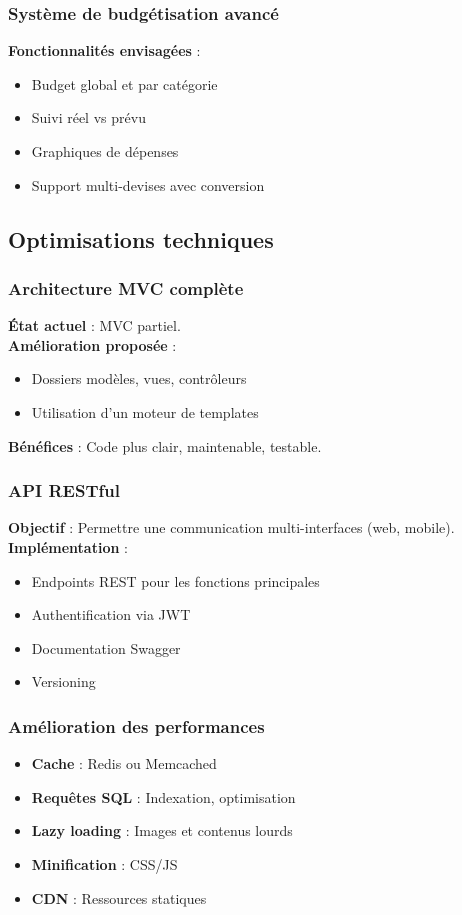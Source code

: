 \documentclass[a4paper,12pt]{article}
\begin{document}
\subsubsection{Système de budgétisation avancé}
\textbf{Fonctionnalités envisagées} :
\begin{itemize}
  \item Budget global et par catégorie
  \item Suivi réel vs prévu
  \item Graphiques de dépenses
  \item Support multi-devises avec conversion
\end{itemize}

\subsection{Optimisations techniques}

\subsubsection{Architecture MVC complète}
\textbf{État actuel} : MVC partiel.\\
\textbf{Amélioration proposée} :
\begin{itemize}
  \item Dossiers modèles, vues, contrôleurs
  \item Utilisation d’un moteur de templates
\end{itemize}
\textbf{Bénéfices} : Code plus clair, maintenable, testable.

\subsubsection{API RESTful}
\textbf{Objectif} : Permettre une communication multi-interfaces (web, mobile).\\
\textbf{Implémentation} :
\begin{itemize}
  \item Endpoints REST pour les fonctions principales
  \item Authentification via JWT
  \item Documentation Swagger
  \item Versioning
\end{itemize}

\subsubsection{Amélioration des performances}
\begin{itemize}
  \item \textbf{Cache} : Redis ou Memcached
  \item \textbf{Requêtes SQL} : Indexation, optimisation
  \item \textbf{Lazy loading} : Images et contenus lourds
  \item \textbf{Minification} : CSS/JS
  \item \textbf{CDN} : Ressources statiques
\end{itemize}
\end{document}
